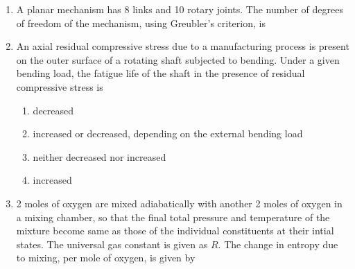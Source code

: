 \documentclass[journal,12pt,onecolumn]{IEEEtran}
\begin{document}
\begin{enumerate}
    \item A planar mechanism has 8 links and 10 rotary joints. The number of degrees of freedom of the mechanism, using Greubler's criterion, is\\

          \begin{enumerate}
          \end{enumerate}

    \item An axial residual compressive stress due to a manufacturing process is present on the outer surface of a rotating shaft subjected to bending. Under a given bending load, the fatigue life of the shaft in the presence of residual compressive stress is\\

          \begin{enumerate}
              \item decreased
              \item increased or decreased, depending on the external bending load
              \item neither decreased nor increased
              \item increased
          \end{enumerate}

    \item 2 moles of oxygen are mixed adiabatically with another 2 moles of oxygen in a mixing chamber, so that the final total pressure and temperature of the mixture become same as those of the individual constituents at their intial states. The universal gas constant is given as $R$. The change in entropy due to mixing, per mole of oxygen, is given by\\

          \begin{enumerate}
          \end{enumerate}


\end{enumerate}
\end{document}
